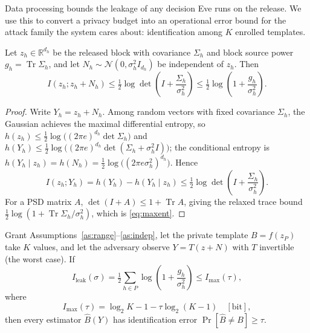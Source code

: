 Data processing bounds the leakage of any decision Eve runs on the release.
We use this to convert a privacy budget into an operational error bound for the
attack family the system cares about: identification among $K$ enrolled
templates.

\begin{lemma}
\label{lm:maxent}
Let $z_h\in\mathbb{R}^{d_h}$ be the released block with covariance $\Sigma_h$
and block source power $g_h=\operatorname{Tr}\Sigma_h$, and let
$N_h\sim\mathcal{N}(0,\sigma_h^{2}I_{d_h})$ be independent of $z_h$. Then
\begin{equation}
I(z_h;z_h+N_h)\le\tfrac12\log\det\!\left(I+\frac{\Sigma_h}{\sigma_h^{2}}\right)
\le\tfrac12\log\!\left(1+\frac{g_h}{\sigma_h^{2}}\right).
\label{eq:maxent}
\end{equation}
\end{lemma}

\begin{proof}
Write $Y_h=z_h+N_h$. Among random vectors with fixed covariance $\Sigma_h$, the
Gaussian achieves the maximal differential entropy, so
$h(z_h)\le\tfrac12\log\big((2\pi e)^{d_h}\det\Sigma_h\big)$ and
$h(Y_h)\le\tfrac12\log\big((2\pi e)^{d_h}\det(\Sigma_h+\sigma_h^{2}I)\big)$;
the conditional entropy is
$h(Y_h\mid z_h)=h(N_h)=\tfrac12\log\big((2\pi e\sigma_h^{2})^{d_h}\big)$. Hence
\begin{equation*}
I(z_h;Y_h)=h(Y_h)-h(Y_h\mid z_h)
\le \tfrac12\log\det\!\left(I+\frac{\Sigma_h}{\sigma_h^{2}}\right).
\end{equation*}
For a PSD matrix $A$, $\det(I+A)\le 1+\operatorname{Tr}A$, giving the relaxed
trace bound $\tfrac12\log(1+\operatorname{Tr}\Sigma_h/\sigma_h^{2})$, which is
\eqref{eq:maxent}.
\end{proof}

\begin{theorem}
\label{th:certificate}
Grant Assumptions~\ref{as:range}--\ref{as:indep}, let the private template
$B=f(z_P)$ take $K$ values, and let the adversary observe
$Y=T(z+N)$ with $T$ invertible (the worst case). If
\begin{equation}
I_{\mathrm{leak}}(\sigma)
=\tfrac12\!\!\sum_{h\in P}\!\log\!\left(1+\frac{g_h}{\sigma_h^{2}}\right)
\le I_{\max}(\tau),
\label{eq:leak}
\end{equation}
where
\begin{equation}
I_{\max}(\tau)=\log_2 K-1-\tau\log_2(K-1)\quad[\text{bit}],
\label{eq:imax}
\end{equation}
then every estimator $\widehat B(Y)$ has identification error
$\Pr[\widehat B\neq B]\ge\tau$.
\end{theorem}

